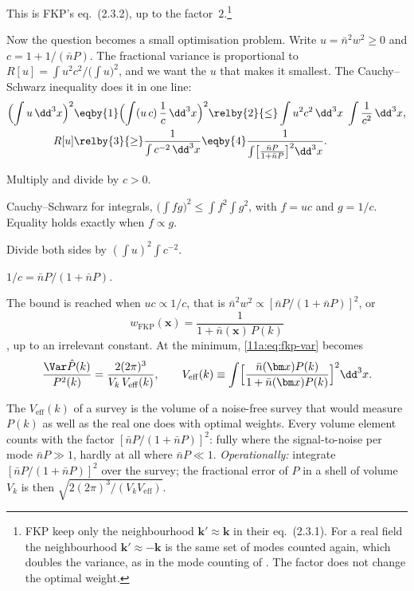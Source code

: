 This is FKP's eq.~(2.3.2), up to the factor~$2$.\footnote{FKP keep only the
neighbourhood $\bm k'\approx\bm k$ in their eq.~(2.3.1). For a real field the
neighbourhood $\bm k'\approx-\bm k$ is the same set of modes counted again, which
doubles the variance, as in the mode counting of
. The factor does not change the optimal
weight.}

Now the question becomes a small optimisation problem. Write $u=\bar n^2w^2\ge0$
and $c=1+1/(\bar nP)$. The fractional variance is proportional to
$R[u]=\int u^2c^2/\bigl(\int u\bigr)^2$, and we want the $u$ that makes it
smallest. The Cauchy--Schwarz inequality does it in one line:
\begin{align}
  \Bigl(\int u\,\dd^3x\Bigr)^2
  &\eqby{1}\Bigl(\int (u\,c)\,\frac1c\,\dd^3x\Bigr)^2
   \relby{2}{\le}\int u^2c^2\,\dd^3x\;\int\frac{1}{c^2}\,\dd^3x,\nonumber\\
  R[u]&\relby{3}{\ge}\frac{1}{\int c^{-2}\,\dd^3x}
   \eqby{4}\frac{1}{\int\bigl[\frac{\bar nP}{1+\bar nP}\bigr]^2\dd^3x}.
  \label{11a:eq:fkp-cs}
\end{align}
\begin{explain}
  \item Multiply and divide by $c>0$.
  \item Cauchy--Schwarz for integrals,
        $\bigl(\int fg\bigr)^2\le\int f^2\int g^2$, with $f=uc$ and $g=1/c$.
        Equality holds exactly when $f\propto g$.
  \item Divide both sides by $(\int u)^2\int c^{-2}$.
  \item $1/c=\bar nP/(1+\bar nP)$.
\end{explain}
The bound is reached when $uc\propto1/c$, that is $\bar n^2w^2\propto
[\bar nP/(1+\bar nP)]^2$, or
\begin{equation}
  w_{\mathrm{FKP}}(\bm x)=\frac{1}{1+\bar n(\bm x)\,P(k)}
  \label{11a:eq:fkp-weight}
\end{equation}
, up to an irrelevant constant. At the minimum,
\eqref{11a:eq:fkp-var} becomes
\begin{equation}
  \frac{\Var\hat P(k)}{P^2(k)}=\frac{2(2\pi)^3}{V_k\,V_{\mathrm{eff}}(k)},\qquad
  V_{\mathrm{eff}}(k)\equiv\int\Bigl[\frac{\bar n(\bm x)P(k)}{1+\bar n(\bm x)P(k)}\Bigr]^2\dd^3x .
  \label{11a:eq:veff}
\end{equation}

\begin{workdef}
The  $V_{\mathrm{eff}}(k)$ of a survey is the volume of a
noise-free survey that would measure $P(k)$ as well  as the real one does with optimal weights. Every volume
element counts with the factor $[\bar nP/(1+\bar nP)]^2$: fully where the
signal-to-noise per mode $\bar nP\gg1$, hardly at all where $\bar nP\ll1$.
\emph{Operationally:} integrate $[\bar nP/(1+\bar nP)]^2$ over the survey; the
fractional error of $P$ in a shell of volume $V_k$ is then
$\sqrt{2(2\pi)^3/(V_kV_{\mathrm{eff}})}$.
\end{workdef}

